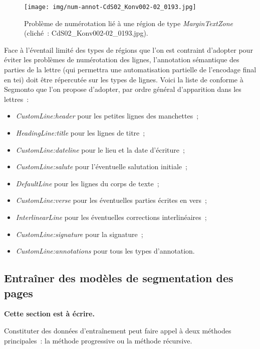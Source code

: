 \documentclass[a4paper,12pt,twoside]{book}
\begin{document}
				\begin{figure}[!h]
					\centering
					\texttt{[image: img/num-annot-CdS02\_Konv002-02\_0193.jpg]}
					\caption{Problème de numérotation lié à une région de type \textit{MarginTextZone} (cliché~: CdS02\_Konv002-02\_0193.jpg).}
					\label{num-annot-193}
				\end{figure}
				
				Face à l'éventail limité des types de régions que l'on est contraint d'adopter pour éviter les problèmes de numérotation des lignes, l'annotation sémantique des parties de la lettre (qui permettra une automatisation partielle de l'encodage final en \gls{tei}) doit être répercutée sur les types de lignes. Voici la liste de conforme à \gls{Segmonto} que l'on propose d'adopter, par ordre général d'apparition dans les lettres~:
				
				\begin{itemize}
					\item \textit{CustomLine:header} pour les petites lignes des manchettes~;
					\item \textit{HeadingLine:title} pour les lignes de titre~;
					\item \textit{CustomLine:dateline} pour le lieu et la date d'écriture~;
					\item \textit{CustomLine:salute} pour l'éventuelle salutation initiale~;
					\item \textit{DefaultLine} pour les lignes du corps de texte~;
					\item \textit{CustomLine:verse} pour les éventuelles parties écrites en vers~;
					\item \textit{InterlinearLine} pour les éventuelles corrections interlinéaires~;\label{interlinear}
					\item \textit{CustomLine:signature} pour la signature~;
					\item \textit{CustomLine:annotations} pour tous les types d'annotation.
				\end{itemize}
		
			\subsection{Entraîner des modèles de segmentation des pages}
	    		\textbf{Cette section est à écrire.}
	    		
	    		\label{recursive}
	    		Constituter des données d'entraînement peut faire appel à deux méthodes principales~: la méthode progressive ou la méthode récursive.
	    		
\end{document}
